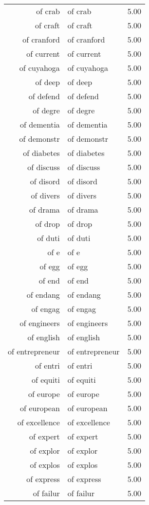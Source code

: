 \begin{table}[ht]
\begin{tabular}{rlr}
  of crab & of crab & 5.00 \\ 
  of craft & of craft & 5.00 \\ 
  of cranford & of cranford & 5.00 \\ 
  of current & of current & 5.00 \\ 
  of cuyahoga & of cuyahoga & 5.00 \\ 
  of deep & of deep & 5.00 \\ 
  of defend & of defend & 5.00 \\ 
  of degre & of degre & 5.00 \\ 
  of dementia & of dementia & 5.00 \\ 
  of demonstr & of demonstr & 5.00 \\ 
  of diabetes & of diabetes & 5.00 \\ 
  of discuss & of discuss & 5.00 \\ 
  of disord & of disord & 5.00 \\ 
  of divers & of divers & 5.00 \\ 
  of drama & of drama & 5.00 \\ 
  of drop & of drop & 5.00 \\ 
  of duti & of duti & 5.00 \\ 
  of e & of e & 5.00 \\ 
  of egg & of egg & 5.00 \\ 
  of end & of end & 5.00 \\ 
  of endang & of endang & 5.00 \\ 
  of engag & of engag & 5.00 \\ 
  of engineers & of engineers & 5.00 \\ 
  of english & of english & 5.00 \\ 
  of entrepreneur & of entrepreneur & 5.00 \\ 
  of entri & of entri & 5.00 \\ 
  of equiti & of equiti & 5.00 \\ 
  of europe & of europe & 5.00 \\ 
  of european & of european & 5.00 \\ 
  of excellence & of excellence & 5.00 \\ 
  of expert & of expert & 5.00 \\ 
  of explor & of explor & 5.00 \\ 
  of explos & of explos & 5.00 \\ 
  of express & of express & 5.00 \\ 
  of failur & of failur & 5.00 \\ 

\end{tabular}
\end{table}
